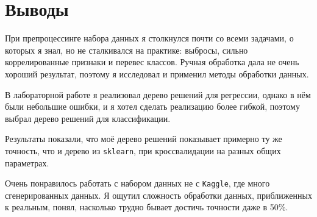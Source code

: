 \section{Выводы}

При препроцессинге набора данных я столкнулся почти со всеми задачами, о которых я знал, но не сталкивался на практике: выбросы, сильно коррелированные признаки и перевес классов. Ручная обработка дала не очень хороший результат, поэтому я исследовал и применил методы обработки данных.

В лабораторной работе я реализовал дерево решений для регрессии, однако в нём были небольшие ошибки, и я хотел сделать реализацию более гибкой, поэтому выбрал дерево решений для классификации.

Результаты показали, что моё дерево решений показывает примерно ту же точность, что и дерево из \texttt{sklearn}, при кроссвалидации на разных общих параметрах.

Очень понравилось работать с набором данных не с \texttt{Kaggle}, где много сгенерированных данных. Я ощутил сложность обработки данных, приближенных к реальным, понял, насколько трудно бывает достичь точности даже в 50\%.
\pagebreak
